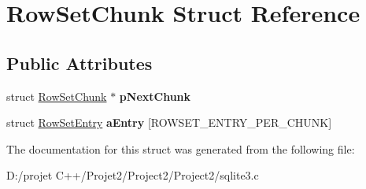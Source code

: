 \hypertarget{struct_row_set_chunk}{}\section{Row\+Set\+Chunk Struct Reference}
\label{struct_row_set_chunk}
\subsection*{Public Attributes}
\begin{DoxyCompactItemize}
\item 
\mbox{\label{struct_row_set_chunk_ae8f0975c86633ae2bb8b212d3a767554}} 
struct \mbox{\hyperlink{struct_row_set_chunk}{Row\+Set\+Chunk}} $\ast$ {\bfseries p\+Next\+Chunk}
\item 
\mbox{\label{struct_row_set_chunk_abde97bbb07c3bf9454e719ff860bdd1f}} 
struct \mbox{\hyperlink{struct_row_set_entry}{Row\+Set\+Entry}} {\bfseries a\+Entry} \mbox{[}R\+O\+W\+S\+E\+T\+\_\+\+E\+N\+T\+R\+Y\+\_\+\+P\+E\+R\+\_\+\+C\+H\+U\+NK\mbox{]}
\end{DoxyCompactItemize}


The documentation for this struct was generated from the following file\+:\begin{DoxyCompactItemize}
\item 
D\+:/projet C++/\+Projet2/\+Project2/\+Project2/sqlite3.\+c\end{DoxyCompactItemize}
